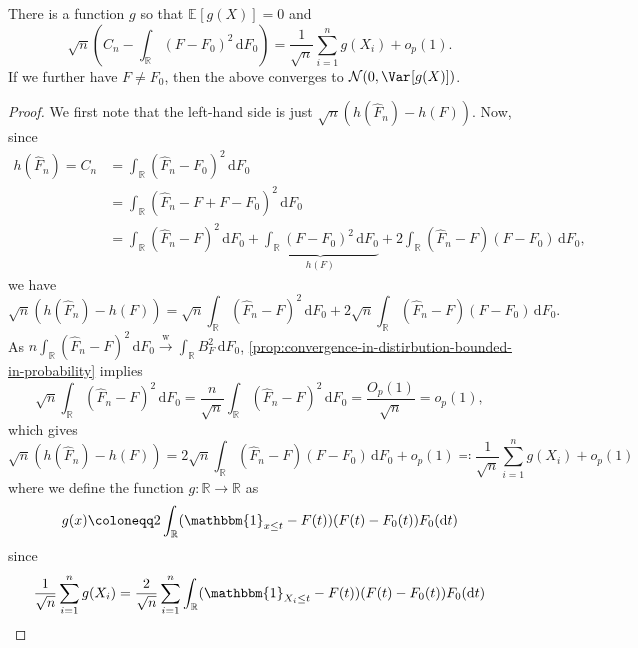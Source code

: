 \begin{proposition}\label{prop:Cramér-von-Mises-representation}
	There is a function \(g\) so that \(\mathbb{E}_{}[g(X)] = 0\) and
	\[
		\sqrt{n} \left( C_n - \int _\mathbb{R} (F - F_0)^2 \,\mathrm{d} F_0 \right)
		= \frac{1}{\sqrt{n} } \sum_{i=1}^{n} g(X_i) + o_p(1).
	\]
	If we further have \(F \neq F_0\), then the above converges to \(\mathcal{N} (0, \Var_{}[g(X)] )\).
\end{proposition}
\begin{proof}
	We first note that the left-hand side is just \(\sqrt{n} (h(\hat{F} _n) - h(F))\). Now, since
	\[
		\begin{split}
			h(\hat{F} _n)
			= C_n
			 & = \int _\mathbb{R} (\hat{F} _n - F_0)^2 \,\mathrm{d} F_0                                                                                                                                     \\
			 & = \int _\mathbb{R} (\hat{F} _n - F + F - F_0)^2 \,\mathrm{d} F_0                                                                                                                             \\
			 & = \int _\mathbb{R} (\hat{F} _n - F)^2 \,\mathrm{d} F_0 + \underbrace{\int _\mathbb{R} (F - F_0)^2 \,\mathrm{d} F_0}_{h(F)} + 2 \int _\mathbb{R} (\hat{F} _n - F) (F - F_0) \,\mathrm{d} F_0,
		\end{split}
	\]
	we have
	\[
		\sqrt{n} \left( h(\hat{F} _n) - h(F) \right)
		= \sqrt{n} \int _\mathbb{R} (\hat{F} _n - F)^2 \,\mathrm{d} F_0 + 2 \sqrt{n} \int _\mathbb{R} (\hat{F} _n - F) (F - F_0) \,\mathrm{d} F_0.
	\]
	As \(n \int _\mathbb{R} (\hat{F} _n - F)^2 \,\mathrm{d} F_0 \overset{\text{w} }{\to} \int _\mathbb{R} B_F^2 \,\mathrm{d} F_0\), \autoref{prop:convergence-in-distirbution-bounded-in-probability} implies
	\[
		\sqrt{n} \int _\mathbb{R} (\hat{F} _n - F)^2 \,\mathrm{d} F_0
		= \frac{n}{\sqrt{n} } \int _\mathbb{R} (\hat{F} _n - F)^2 \,\mathrm{d} F_0
		= \frac{O_p(1)}{\sqrt{n} }
		= o_p(1),
	\]
	which gives
	\[
		\sqrt{n} \left( h(\hat{F} _n) - h(F) \right)
		= 2 \sqrt{n} \int _\mathbb{R} (\hat{F} _n - F) (F - F_0) \,\mathrm{d} F_0 + o_p(1)
		\eqqcolon \frac{1}{\sqrt{n} } \sum_{i=1}^{n} g(X_i) + o_p(1)
	\]
	where we define the function \(g \colon \mathbb{R} \to \mathbb{R} \) as
	\[
		g(x)
		\coloneqq 2 \int _\mathbb{R} (\mathbbm{1}_{x \leq t} - F(t)) (F(t) - F_0(t)) F_0(\mathrm{d} t)
	\]
	since
	\[
		\begin{split}
			\frac{1}{\sqrt{n} } \sum_{i=1}^{n} g(X_i)
			 & = \frac{2}{\sqrt{n} } \sum_{i=1}^{n} \int _\mathbb{R} (\mathbbm{1}_{X_i \leq t} - F(t)) (F(t) - F_0(t)) F_0(\mathrm{d} t)                                            \\

\end{split}\]
\end{proof}
